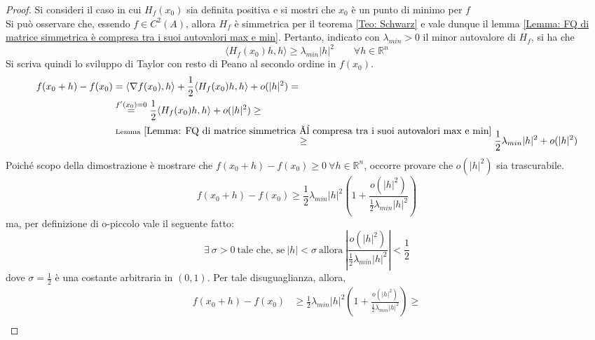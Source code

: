     \begin{proof}
        Si consideri il caso in cui $H_f(x_0)$ sia definita positiva e si mostri che $x_0$ è un punto di minimo per $f$\\
        Si può osservare che, essendo $f \in C^2(A)$, allora $H_f$ è simmetrica per il teorema \ref{Teo: Schwarz} e vale dunque il lemma \ref{Lemma: FQ di matrice simmetrica è compresa tra i suoi autovalori max e min}. Pertanto, indicato con $\lambda_{min}>0$ il minor autovalore di $H_f$, si ha che
        \begin{equation*}
            \langle H_f(x_0)h,h \rangle \geq \lambda_{min} |h|^2 \qquad \forall h \in \mathbb{R}^n
        \end{equation*}
        Si scriva quindi lo sviluppo di Taylor con resto di Peano al secondo ordine in $f(x_0)$.
        \begin{equation*}
        \begin{aligned}
            f(x_0+h)-f(x_0)&= \langle \nabla f(x_0), h \rangle + \frac{1}{2}\langle H_f(x_0)h   , h\rangle + o(|h|^2)=\\
            &\overset{f'(x_0)=0}{=} \frac{1}{2}\langle H_f(x_0)h, h\rangle + o(|h|^2) \geq \\
            &\overset{\text{Lemma}\ \ref{Lemma: FQ di matrice simmetrica è compresa tra i suoi autovalori max e min}}{\geq} \frac{1}{2} \lambda_{min}|h|^2+o(|h|^2)
        \end{aligned}
        \end{equation*}
        Poiché scopo della dimostrazione è mostrare che $f(x_0+h)-f(x_0) \geq 0\ \forall h \in \mathbb{R}^n$, occorre provare che $o(|h|^2)$ sia trascurabile.
        \begin{equation*}
            f(x_0+h)- f(x_0) \geq \frac{1}{2}\lambda_{min} |h|^2 \left( 1 + \frac{o(|h|^2)}{\tfrac{1}{2}\lambda_{min}|h|^2}\right)
        \end{equation*}
        ma, per definizione di o-piccolo vale il seguente fatto:
        \begin{equation*}
            \exists\ \sigma >0\ \text{tale che, se}\ |h|<\sigma\ \text{allora}\ \left|\frac{o(|h|^2)}{\tfrac{1}{2}\lambda_{min} |h|^2}\right| < \frac{1}{2}
        \end{equation*}
        dove $\sigma=\frac{1}{2}$ è una costante arbitraria in $(0,1)$.
        Per tale disuguaglianza, allora, 
        \begin{equation*}
        \begin{aligned}
            f(x_0+h)-f(x_0)&\geq \frac{1}{2}\lambda_{min} |h|^2 \left( 1 + \frac{o(|h|^2)}{\tfrac{1}{2}\lambda_{min}|h|^2}\right) \geq \\

\end{aligned}
\end{equation*}
\end{proof}
